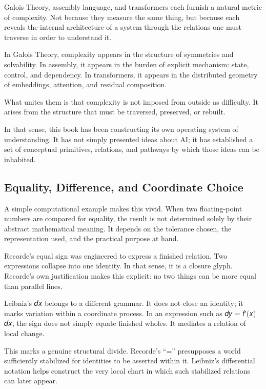\documentclass[
]{article}
\begin{document}
Galois Theory, assembly language, and transformers each furnish a
natural metric of complexity. Not because they measure the same thing,
but because each reveals the internal architecture of a system through
the relations one must traverse in order to understand it.

In Galois Theory, complexity appears in the structure of symmetries and
solvability. In assembly, it appears in the burden of explicit
mechanism: state, control, and dependency. In transformers, it appears
in the distributed geometry of embeddings, attention, and residual
composition.

What unites them is that complexity is not imposed from outside as
difficulty. It arises from the structure that must be traversed,
preserved, or rebuilt.

In that sense, this book has been constructing its own operating system
of understanding. It has not simply presented ideas about AI; it has
established a set of conceptual primitives, relations, and pathways by
which those ideas can be inhabited.

\hypertarget{equality-difference-and-coordinate-choice}{%
\subsection{Equality, Difference, and Coordinate
Choice}\label{equality-difference-and-coordinate-choice}}

A simple computational example makes this vivid. When two floating-point
numbers are compared for equality, the result is not determined solely
by their abstract mathematical meaning. It depends on the tolerance
chosen, the representation used, and the practical purpose at hand.

Recorde's equal sign was engineered to express a finished relation. Two
expressions collapse into one identity. In that sense, it is a closure
glyph. Recorde's own justification makes this explicit: no two things
can be more equal than parallel lines.

Leibniz's 𝑑𝑥 belongs to a different grammar. It does not close an
identity; it marks variation within a coordinate process. In an
expression such as 𝑑𝑦 = 𝑓′(𝑥) 𝑑𝑥, the sign does not simply equate
finished wholes. It mediates a relation of local change.

This marks a genuine structural divide. Recorde's ``='' presupposes a
world sufficiently stabilized for identities to be asserted within it.
Leibniz's differential notation helps construct the very local chart in
which such stabilized relations can later appear.
\end{document}
